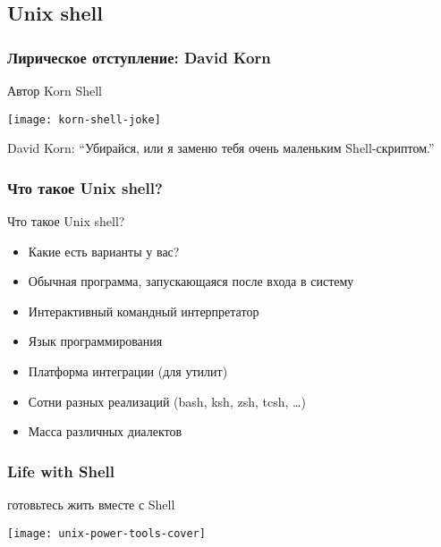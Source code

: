 \subsection{Unix shell}
\begin{frame}
  \frametitle{Лирическое отступление: David Korn}
  \begin{center}
    Автор Korn Shell

    \texttt{[image: korn-shell-joke]} 

    David Korn: ``Убирайся, или я заменю тебя очень маленьким Shell-скриптом.''
  \end{center}
\end{frame}

\begin{frame}
  \frametitle{Что такое Unix shell?}
  
  \alert{Что такое Unix shell?}

  \begin{itemize}
    \item Какие есть варианты у вас? \pause
    \item Обычная программа, запускающаяся после входа в систему \pause
    \item Интерактивный командный интерпретатор \pause
    \item Язык программирования \pause
    \item Платформа интеграции (для утилит) \pause
    \item Сотни разных реализаций (bash, ksh, zsh, tcsh, \ldots ) \pause
    \item Масса различных диалектов
  \end{itemize}

\end{frame}

\begin{frame}
  \frametitle{Life with Shell}

  \begin{center}
    \Large{готовьтесь жить вместе с Shell}
    \newline
    
    \texttt{[image: unix-power-tools-cover]} 
  \end{center}

\end{frame}

